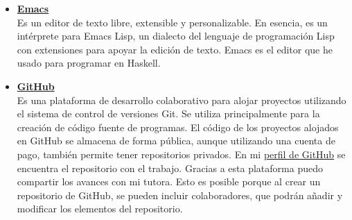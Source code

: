 \begin{itemize}
\item \href{https://www.gnu.org/software/emacs/}{\textbf{Emacs}}\\
Es un editor de texto libre, extensible y personalizable. En esencia, es un intérprete para Emacs Lisp, un dialecto del lenguaje de programación Lisp con extensiones para apoyar la edición de texto. Emacs es el editor que he usado para programar en Haskell.

\item \href{https://github.com/}{\textbf{GitHub}}\\
Es una plataforma de desarrollo colaborativo para alojar proyectos utilizando el sistema de control de versiones Git. Se utiliza principalmente para la creación de código fuente de programas. El código de los proyectos alojados en GitHub se almacena de forma pública, aunque utilizando una cuenta de pago, también permite tener repositorios privados. En mi \href{https://github.com/AngelaGM10}{perfil de GitHub} se encuentra el repositorio con el trabajo. Gracias a esta plataforma puedo compartir los avances con mi tutora. Esto es posible porque al crear un repositorio de GitHub, se pueden incluir colaboradores, que podrán añadir y modificar los elementos del repositorio.

\end{itemize}